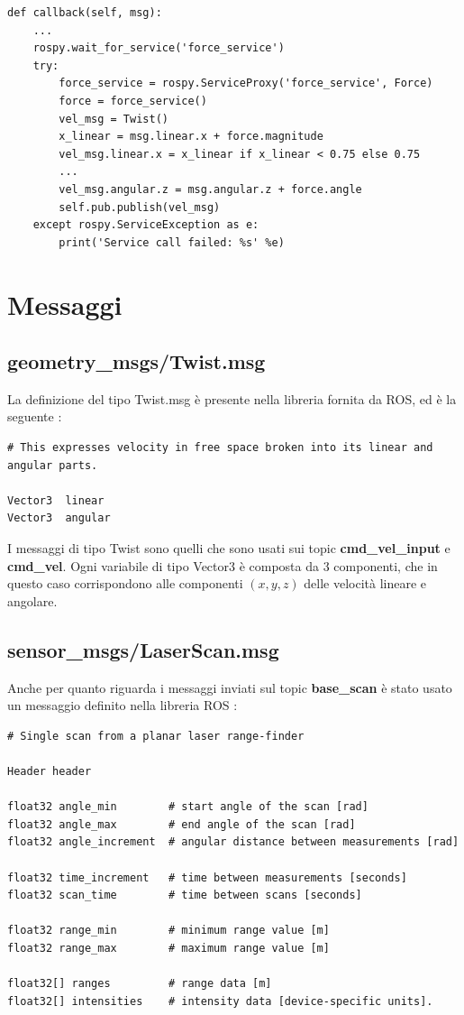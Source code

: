 \documentclass[Lau, binding=0.6cm, oneside]{sapthesis}
\begin{document}
\begin{lstlisting}
def callback(self, msg):
    ...
    rospy.wait_for_service('force_service')
    try:
        force_service = rospy.ServiceProxy('force_service', Force)
        force = force_service()
        vel_msg = Twist()
        x_linear = msg.linear.x + force.magnitude
        vel_msg.linear.x = x_linear if x_linear < 0.75 else 0.75
        ...
        vel_msg.angular.z = msg.angular.z + force.angle
        self.pub.publish(vel_msg)
    except rospy.ServiceException as e:
        print('Service call failed: %s' %e)
\end{lstlisting}

\section{Messaggi}
\subsection{geometry\_msgs/Twist.msg}
La definizione del tipo Twist.msg è presente nella libreria fornita da ROS, ed è la seguente \cite{fonte5}:
\begin{lstlisting}
# This expresses velocity in free space broken into its linear and angular parts.

Vector3  linear
Vector3  angular
\end{lstlisting}
I messaggi di tipo Twist sono quelli che sono usati sui topic \textbf{cmd\_vel\_input} e \textbf{cmd\_vel}.
Ogni variabile di tipo Vector3 è composta da 3 componenti, che in questo caso corrispondono alle componenti  $(x, y, z)$ delle velocità lineare e angolare.

\subsection{sensor\_msgs/LaserScan.msg}
Anche per quanto riguarda i messaggi inviati sul topic \textbf{base\_scan} è stato usato un messaggio definito nella libreria ROS \cite{fonte6}:
\begin{lstlisting}
# Single scan from a planar laser range-finder

Header header

float32 angle_min        # start angle of the scan [rad]
float32 angle_max        # end angle of the scan [rad]
float32 angle_increment  # angular distance between measurements [rad]

float32 time_increment   # time between measurements [seconds]
float32 scan_time        # time between scans [seconds]

float32 range_min        # minimum range value [m]
float32 range_max        # maximum range value [m]

float32[] ranges         # range data [m]
float32[] intensities    # intensity data [device-specific units].
\end{lstlisting}
\end{document}
